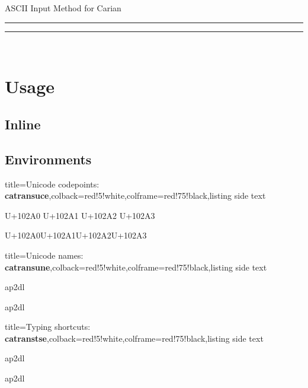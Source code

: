 \documentclass{article}
\begin{document}
\begin{center}
{\ttfamily ASCII Input Method for Carian}

\rule{0.4\textwidth}{0.2pt}
\end{center}

\tableofcontents

\bigskip
\hfill\rule{0.4\textwidth}{0.2pt}\hfill\ 

\section{Usage}
\subsection{Inline}







\subsection{Environments}

\bigskip
\begin{tcblisting}{title={{\sffamily Unicode codepoints: \bfseries\textcolor{blue!10}{catransuce}}},colback=red!5!white,colframe=red!75!black,listing side text}
\begin{catransuce}
U+102A0 U+102A1 U+102A2 U+102A3

U+102A0U+102A1U+102A2U+102A3
\end{catransuce}
\end{tcblisting}

\bigskip
\begin{tcblisting}{title={{\sffamily Unicode names: \bfseries\textcolor{blue!10}{catransune}}},colback=red!5!white,colframe=red!75!black,listing side text}
\begin{catransune}
ap2dl

ap2dl
\end{catransune}
\end{tcblisting}

\bigskip
\begin{tcblisting}{title={{\sffamily Typing shortcuts: \bfseries\textcolor{blue!10}{catranstse}}},colback=red!5!white,colframe=red!75!black,listing side text}
\begin{catranstse}
ap2dl

ap2dl
\end{catranstse}
\end{tcblisting}
\end{document}
